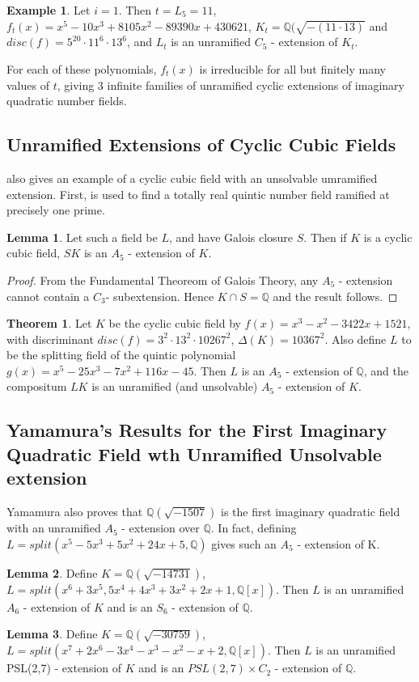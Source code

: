 \documentclass[12pt]{extarticle}
\newcommand{\Q}{\mathbb{Q}}
\newcommand{\<}{\langle}
\renewcommand{\>}{\rangle}
\theoremstyle{definition}
\newtheorem{theorem}{Theorem}
\newtheorem*{example}{Example}
\newtheorem{lemma}{Lemma}
\begin{document}
\begin{example}
Let $i=1$. Then $t=L_{5} = 11$, $f_t(x) = x^5 - 10x^3 + 8105x^2 - 89390x + 430621$, $K_t = \Q(\sqrt{-( 11 \cdot13)}$ and $disc(f) =5^{20} \cdot 11^6 \cdot 13^6
$,  and $L_t$ is an unramified $C_5$ - extension of $K_t$. 
\end{example}
For each of these polynomials, $f_t(x)$ is irreducible for all but finitely many values of $t$, giving 3 infinite families of unramified cyclic extensions of imaginary quadratic number fields. 


\subsection{Unramified Extensions of Cyclic Cubic Fields}
\cite{WONG} also gives an example of a cyclic cubic field with an unsolvable umramified extension.
First, \cite{JONE2} is used to find a totally real quintic number field ramified at precisely one prime.

\begin{lemma}
 Let such a field be $L$, and have Galois closure $S$. Then if $K$ is a cyclic cubic field, $SK$ is an $A_5$ - extension of $K$.
\end{lemma}
\begin{proof}
From the Fundamental Theoreom of Galois Theory, any $A_5$ - extension cannot contain a $C_3$- subextension. Hence $K \cap S = \Q$ and the result follows.
\end{proof}
\begin{theorem}
Let $K$ be the cyclic cubic field by $f(x) = x^3 - x^2 - 3422x + 1521$, with discriminant $disc(f) = 3^2 \cdot 13^2 \cdot 10267^2$, $\Delta(K) = 10367^2$. Also define $L$ to be the splitting field of the quintic polynomial $g(x) = x^5 - 25x^3 - 7x^2 + 116x - 45$. Then $L$ is an $A_5$ - extension of $\Q$, and the compositum $LK$ is an unramified (and unsolvable) $A_5$ - extension of $K$.
\end{theorem}
\subsection{Yamamura's Results for the First Imaginary Quadratic Field wth Unramified Unsolvable extension}
Yamamura also proves that $\Q(\sqrt{-1507})$ is the first imaginary quadratic field with an unramified $A_5$ - extension over $\Q$. In fact, defining $L=split\left( x^5-5x^3+5x^2+24x+5,\Q\right)$ gives such an $A_5$ - extension of K. 
\begin{lemma}
Define $K=\Q(\sqrt{-14731})$, $L=split(x^6+3x^5,5x^4+4x^3+3x^2+2x+1,\Q[x])$. Then $L$ is an unramified $A_6$ - extension of $K$ and is an $S_6$ - extension of $\Q$.
\end{lemma}
\begin{lemma}
Define $K=\Q(\sqrt{-30759})$, $L=split(x^7+2x^6-3x^4-x^3-x^2-x+2,\Q[x])$. Then $L$ is an unramified PSL(2,7) - extension of $K$ and is an $PSL(2,7)\times C_2$ - extension of $\Q$.
\end{lemma}
\end{document}
